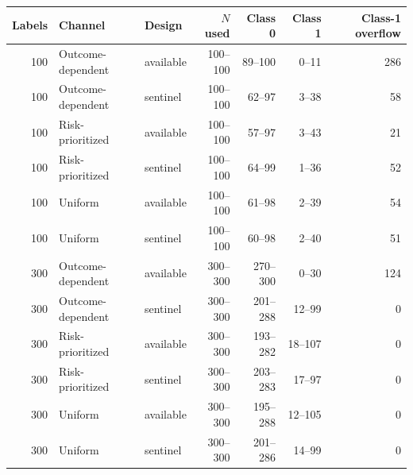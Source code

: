\begin{tabular}{rllrrrr}
\toprule
Labels & Channel & Design & $N$ used & Class 0 & Class 1 & Class-1 overflow \\
\midrule
100 & Outcome-dependent & available & 100--100 & 89--100 & 0--11 & 286 \\
100 & Outcome-dependent & sentinel & 100--100 & 62--97 & 3--38 & 58 \\
100 & Risk-prioritized & available & 100--100 & 57--97 & 3--43 & 21 \\
100 & Risk-prioritized & sentinel & 100--100 & 64--99 & 1--36 & 52 \\
100 & Uniform & available & 100--100 & 61--98 & 2--39 & 54 \\
100 & Uniform & sentinel & 100--100 & 60--98 & 2--40 & 51 \\
300 & Outcome-dependent & available & 300--300 & 270--300 & 0--30 & 124 \\
300 & Outcome-dependent & sentinel & 300--300 & 201--288 & 12--99 & 0 \\
300 & Risk-prioritized & available & 300--300 & 193--282 & 18--107 & 0 \\
300 & Risk-prioritized & sentinel & 300--300 & 203--283 & 17--97 & 0 \\
300 & Uniform & available & 300--300 & 195--288 & 12--105 & 0 \\
300 & Uniform & sentinel & 300--300 & 201--286 & 14--99 & 0 \\
\bottomrule
\end{tabular}

